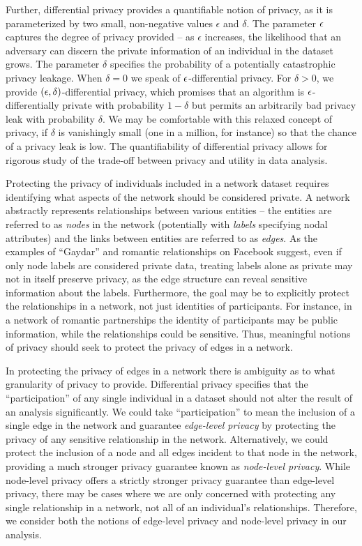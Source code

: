 Further, differential privacy provides a quantifiable notion of privacy, as it is parameterized by two small, non-negative values $\epsilon$ and $\delta$. The parameter $\epsilon$ captures the degree of privacy provided -- as $\epsilon$ increases, the likelihood that an adversary can discern the private information of an individual in the dataset grows. The parameter $\delta$ specifies the probability of a potentially catastrophic privacy leakage. When $\delta = 0$ we speak of $\epsilon$-differential privacy. For $\delta > 0$, we provide $(\epsilon, \delta)$-differential privacy, which promises that an algorithm is $\epsilon$-differentially private with probability $1-\delta$ but permits an arbitrarily bad privacy leak with probability $\delta$. We may be comfortable with this relaxed concept of privacy, if $\delta$ is vanishingly small (one in a million, for instance) so that the chance of a privacy leak is low. The quantifiability of differential privacy allows for rigorous study of the trade-off between privacy and utility in data analysis.

Protecting the privacy of individuals included in a network dataset requires identifying what aspects of the network should be considered private. A network abstractly represents relationships between various entities -- the entities are referred to as \emph{nodes} in the network (potentially with \emph{labels} specifying nodal attributes) and the links between entities are referred to as \emph{edges}. As the examples of ``Gaydar'' and romantic relationships on Facebook suggest, even if only node labels are considered private data, treating labels alone as private may not in itself preserve privacy, as the edge structure can reveal sensitive information about the labels. Furthermore, the goal may be to explicitly protect the relationships in a network, not just identities of participants. For instance, in a network of romantic partnerships the identity of participants may be public information, while the relationships could be sensitive. Thus, meaningful notions of privacy should seek to protect the privacy of edges in a network.

In protecting the privacy of edges in a network there is ambiguity as to what granularity of privacy to provide. Differential privacy specifies that the ``participation'' of any single individual in a dataset should not alter the result of an analysis significantly. We could take ``participation'' to mean the inclusion of a single edge in the network and guarantee \emph{edge-level privacy} by protecting the privacy of any sensitive relationship in the network. Alternatively, we could protect the inclusion of a node and all edges incident to that node in the network, providing a much stronger privacy guarantee known as \emph{node-level privacy}. While node-level privacy offers a strictly stronger privacy guarantee than edge-level privacy, there may be cases where we are only concerned with protecting any single relationship in a network, not all of an individual's relationships. Therefore, we consider both the notions of edge-level privacy and node-level privacy in our analysis.

